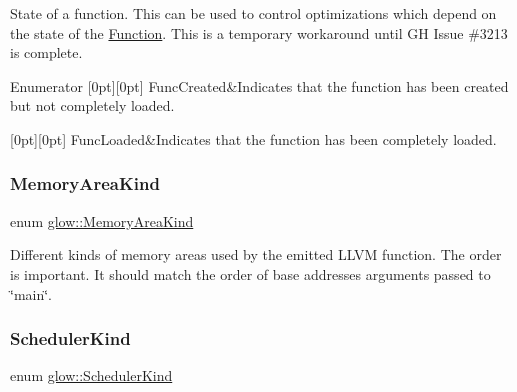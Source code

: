State of a function. This can be used to control optimizations which depend on the state of the \hyperlink{classglow_1_1_function}{Function}. This is a temporary workaround until GH Issue \#3213 is complete. \begin{DoxyEnumFields}{Enumerator}
[0pt][0pt]{}\mbox{\label{namespaceglow_a1c98da7214165b41c7d6b255503d4062a3c96962620eddda2836d6203cf7ecfa0}} 
Func\+Created&Indicates that the function has been created but not completely loaded. \\
\hline

[0pt][0pt]{}\mbox{\label{namespaceglow_a1c98da7214165b41c7d6b255503d4062ae25a0b7e15a925b8bf4d8016db8d27ac}} 
Func\+Loaded&Indicates that the function has been completely loaded. \\
\hline

\end{DoxyEnumFields}
\mbox{\label{namespaceglow_ab04a18d4367765236e5de54c47379e66}} 
\subsubsection{\texorpdfstring{Memory\+Area\+Kind}{MemoryAreaKind}}
{\footnotesize\ttfamily enum \hyperlink{namespaceglow_ab04a18d4367765236e5de54c47379e66}{glow\+::\+Memory\+Area\+Kind}}

Different kinds of memory areas used by the emitted L\+L\+VM function. The order is important. It should match the order of base addresses arguments passed to \char`\"{}main\char`\"{}. \mbox{\label{namespaceglow_af5b11a9c44f948717d6a886891a58b11}} 
\subsubsection{\texorpdfstring{Scheduler\+Kind}{SchedulerKind}}
{\footnotesize\ttfamily enum \hyperlink{namespaceglow_af5b11a9c44f948717d6a886891a58b11}{glow\+::\+Scheduler\+Kind}\hspace{0.3cm}{\ttfamily [strong]}}



